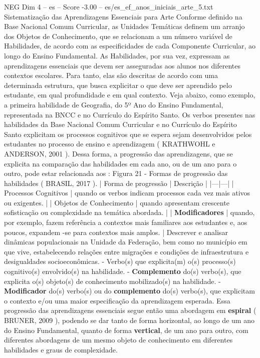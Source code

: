 \begin{textsample}{NEG Dim 4 – es – Score -3.00 – es/es\_ef\_anos\_iniciais\_arte\_5.txt}  \label{ex:f4_neg_215}
Sistematização das Aprendizagens Essenciais para Arte Conforme definido na Base Nacional Comum Curricular, as Unidades Temáticas definem um arranjo dos Objetos de Conhecimento, que se relacionam a um número variável de Habilidades, de acordo com as especificidades de cada Componente Curricular, ao longo do Ensino Fundamental.
As Habilidades, por sua vez, expressam as aprendizagens essenciais que devem ser asseguradas aos alunos nos diferentes contextos escolares.
Para tanto, elas são descritas de acordo com uma determinada estrutura, que busca explicitar o que deve ser aprendido pelo estudante, em qual profundidade e em qual contexto.
Veja abaixo, como exemplo, a primeira habilidade de Geografia, do 5º Ano do Ensino Fundamental, representada na BNCC e no Currículo do Espírito Santo.
Os verbos presentes nas habilidades da Base Nacional Comum Curricular e no Currículo do Espírito Santo explicitam os processos cognitivos que se espera sejam desenvolvidos pelos estudantes no processo de ensino e aprendizagem ( KRATHWOHL e ANDERSON, 2001 ).
Dessa forma, a progressão das aprendizagens, que se explicita na comparação das habilidades em cada ano, ou de um ano para o outro, pode estar relacionada aos : Figura 21 - Formas de progressão das habilidades ( BRASIL, 2017 ). | Forma de progressão | Descrição | |---|---| | Processos Cognitivos | quando os verbos indicam processos cada vez mais ativos ou exigentes. | | Objetos de Conhecimento | quando apresentam crescente sofisticação ou complexidade na temática abordada. | | \textbf{Modificadores} | quando, por exemplo, fazem referência a contextos mais familiares aos estudantes e, aos poucos, expandem -se para contextos mais amplos. | Descrever e analisar dinâmicas populacionais na Unidade da Federação, bem como no município em que vive, estabelecendo relações entre migrações e condições de infraestrutura e desigualdades socioeconômicas. - Verbo(s) que explicita(m) o(s) processo(s) cognitivo(s) envolvido(s) na habilidade. - \textbf{Complemento} do(s) verbo(s), que explicita o(s) objeto(s) de conhecimento mobilizado(s) na habilidade. - \textbf{Modificador} do(s) verbo(s) ou do \textbf{complemento} do(s) verbo(s), que explicitam o contexto e/ou uma maior especificação da aprendizagem esperada.
Essa progressão das aprendizagens essenciais segue então uma abordagem em \textbf{espiral} ( BRUNER, 2009 ), podendo se dar tanto de forma horizontal, ao longo de um ano do Ensino Fundamental, quanto de forma \textbf{vertical}, de um ano para outro, com diferentes abordagens de um mesmo objeto de conhecimento em diferentes habilidades e graus de complexidade.

\end{textsample}
